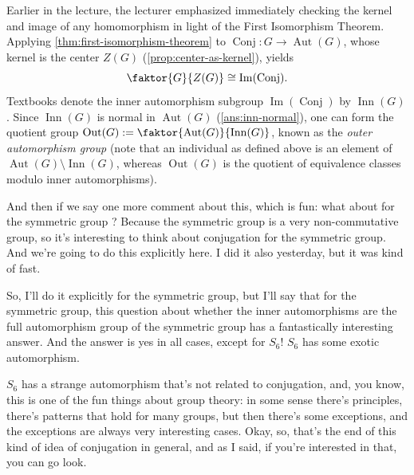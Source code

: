 \begin{aiNote}
Earlier in the lecture, the lecturer emphasized immediately checking the kernel and image of any homomorphism in light of the First Isomorphism Theorem. Applying \cref{thm:first-isomorphism-theorem} to $\operatorname{Conj} \colon G \to \operatorname{Aut}(G)$, whose kernel is the center $Z(G)$ (\cref{prop:center-as-kernel}), yields
\[
\faktor{G}{Z(G)} \cong \operatorname{Im}(\operatorname{Conj}).
\]
Textbooks denote the inner automorphism subgroup $\operatorname{Im}(\operatorname{Conj})$ by $\operatorname{Inn}(G)$. Since $\operatorname{Inn}(G)$ is normal in $\operatorname{Aut}(G)$ (\cref{ans:inn-normal}), one can form the quotient group $\operatorname{Out}(G) := \faktor{\operatorname{Aut}(G)}{\operatorname{Inn}(G)}$, known as the \emph{outer automorphism group} (note that an individual  as defined above is an element of $\operatorname{Aut}(G) \setminus \operatorname{Inn}(G)$, whereas $\operatorname{Out}(G)$ is the quotient of equivalence classes modulo inner automorphisms).
\end{aiNote}

\begin{speech}[00:29:09 - 00:30:38]
And then if we say one more comment about this, which is fun: what about for the symmetric group ? Because the symmetric group is a very non-commutative group, so it's interesting to think about conjugation for the symmetric group. And we're going to do this explicitly here. I did it also yesterday, but it was kind of fast. 

So, I'll do it explicitly for the symmetric group, but I'll say that for the symmetric group, this question about whether the inner automorphisms are the full automorphism group of the symmetric group has a fantastically interesting answer. And the answer is yes in all cases, except for $S_6$! $S_6$ has some exotic automorphism. 

$S_6$ has a strange automorphism that's not related to conjugation, and, you know, this is one of the fun things about group theory: in some sense there's principles, there's patterns that hold for many groups, but then there's some exceptions, and the exceptions are always very interesting cases. Okay, so, that's the end of this kind of idea of conjugation in general, and as I said, if you're interested in that, you can go look.
\end{speech}

